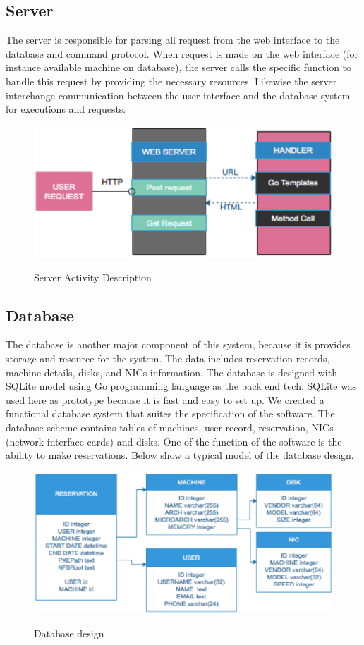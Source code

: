 \subsection{Server}
The server is responsible for parsing all request from the web interface to the database and command protocol. When request is made on the web interface (for instance available machine on database), the server calls the  specific function to handle this request by providing the necessary resources. Likewise the server interchange communication between the user interface and the database system for executions and requests. 
\begin{figure}[h!]
\includegraphics[width = \linewidth]{server.eps}
\label{fig:Description of Server Activity} 
\caption{Server Activity Description}
\end{figure}
\subsection{Database}
The database is another major component of this system, because it is provides storage and resource for the system. The data includes reservation records, machine details, disks, and NICs information. The database is designed with SQLite model using Go programming language as the back end tech. SQLite was used here as prototype because it is fast and easy to set up. We created a functional database system that suites the specification of the software. 
The database scheme contains tables of machines, user record, reservation, NICs (network interface cards) and disks.  One of the function of the software is the ability to make reservations.  Below show a typical model of the database design.
 \begin{figure}[h!]
\includegraphics[width = \linewidth]{database.eps}
\label{fig:Database Schema} 
\caption{Database design}
\end{figure}
\pagebreak
